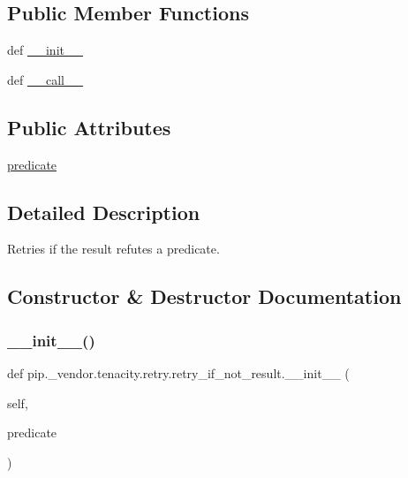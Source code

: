 \subsection*{Public Member Functions}
\begin{DoxyCompactItemize}
\item 
def \hyperlink{classpip_1_1__vendor_1_1tenacity_1_1retry_1_1retry__if__not__result_a46c1d89dafdffec111d08abc1d0a5820}{\+\_\+\+\_\+init\+\_\+\+\_\+}
\item 
def \hyperlink{classpip_1_1__vendor_1_1tenacity_1_1retry_1_1retry__if__not__result_a19c747a88c3a52f41434fa399e98114b}{\+\_\+\+\_\+call\+\_\+\+\_\+}
\end{DoxyCompactItemize}
\subsection*{Public Attributes}
\begin{DoxyCompactItemize}
\item 
\hyperlink{classpip_1_1__vendor_1_1tenacity_1_1retry_1_1retry__if__not__result_a2175686f417fd5fe2a122a8c7a23d211}{predicate}
\end{DoxyCompactItemize}


\subsection{Detailed Description}
\begin{DoxyVerb}Retries if the result refutes a predicate.\end{DoxyVerb}
 

\subsection{Constructor \& Destructor Documentation}
\mbox{\label{classpip_1_1__vendor_1_1tenacity_1_1retry_1_1retry__if__not__result_a46c1d89dafdffec111d08abc1d0a5820}} 
\subsubsection{\texorpdfstring{\+\_\+\+\_\+init\+\_\+\+\_\+()}{\_\_init\_\_()}}
{\footnotesize\ttfamily def pip.\+\_\+vendor.\+tenacity.\+retry.\+retry\+\_\+if\+\_\+not\+\_\+result.\+\_\+\+\_\+init\+\_\+\+\_\+ (\begin{DoxyParamCaption}\item[{}]{self,  }\item[{}]{predicate }\end{DoxyParamCaption})}



